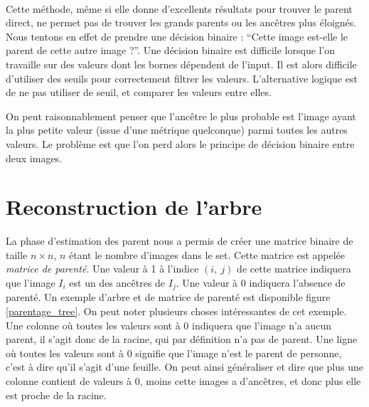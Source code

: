 \documentclass[utf8,final]{stageM2R} %
\begin{document}

\paragraph{}
Cette méthode, même si elle donne d'excellents résultats pour trouver le parent direct, ne permet pas de trouver les grands parents ou les ancêtres plus éloignés. Nous tentons en effet de prendre une décision binaire : ``Cette image est-elle le parent de cette autre image ?''. Une décision binaire est difficile lorsque l'on travaille sur des valeurs dont les bornes dépendent de l'input. Il est alors difficile d'utiliser des seuils pour correctement filtrer les valeurs. L'alternative logique est de ne pas utiliser de seuil, et comparer les valeurs entre elles. 

On peut raisonnablement penser que l'ancêtre le plus probable est l'image ayant la plus petite valeur (issue d'une métrique quelconque) parmi toutes les autres valeurs. Le problème est que l'on perd alors le principe de décision binaire entre deux images.

\section{Reconstruction de l'arbre}
\label{sec:reconstruction}
La phase d'estimation des parent nous a permis de créer une matrice binaire de taille $n\times n$, $n$ étant le nombre d'images dans le set. Cette matrice est appelée \textit{matrice de parenté}. Une valeur à 1 à l'indice $(i,\ j)$ de cette matrice indiquera que l'image $I_i$ est un des ancêtres de $I_j$. Une valeur à 0 indiquera l'absence de parenté. Un exemple d'arbre et de matrice de parenté est disponible figure \ref{parentage_tree}. On peut noter plusieurs choses intéressantes de cet exemple. Une colonne où toutes les valeurs sont à 0 indiquera que l'image n'a aucun parent, il s'agit donc de la racine, qui par définition n'a pas de parent. Une ligne où toutes les valeurs sont à 0 signifie que l'image n'est le parent de personne, c'est à dire qu'il s'agit d'une feuille. On peut ainsi généraliser et dire que plus une colonne contient de valeurs à 0, moins cette images a d'ancêtres, et donc plus elle  est proche de la racine.
\end{document}
